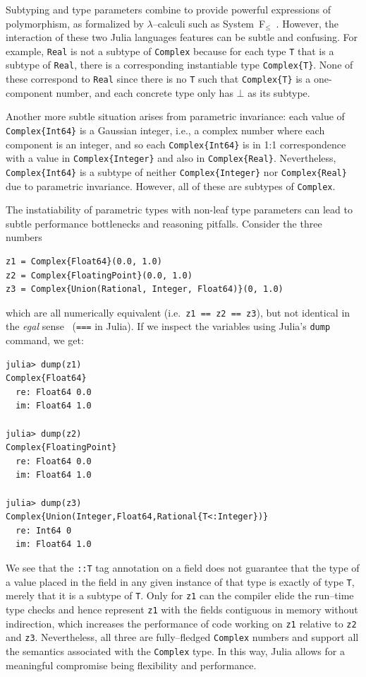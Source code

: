 \documentclass[pldi]{sigplanconf-pldi15}
\begin{document}
Subtyping and type parameters combine to provide powerful expressions of
polymorphism, as formalized by $\lambda$--calculi such as
System~F$_\le$~\cite{Cardelli1985}. However, the interaction of these two
Julia languages features can be subtle and confusing. For example, \verb|Real|
is not a subtype of \verb|Complex| because for each type \verb|T| that is a
subtype of \verb|Real|, there is a corresponding instantiable type
\verb|Complex{T}|. None of these correspond to \verb|Real| since there is no
\verb|T| such that \verb|Complex{T}| is a one-component number, and each
concrete type only has $\bot$ as its subtype.

Another more subtle situation arises from parametric invariance: each value of
\verb|Complex{Int64}| is a Gaussian integer, i.e., a complex number where each
component is an integer, and so each \verb|Complex{Int64}| is in 1:1
correspondence with a value in \verb|Complex{Integer}| and also in
\verb|Complex{Real}|. Nevertheless, \verb|Complex{Int64}| is a subtype of
neither \verb|Complex{Integer}| nor \verb|Complex{Real}| due to parametric
invariance. However, all of these are subtypes of \verb|Complex|.

The instatiability of parametric types with non-leaf type parameters can lead
to subtle performance bottlenecks and reasoning pitfalls. Consider the three
 numbers

\begin{lstlisting}
z1 = Complex{Float64}(0.0, 1.0)
z2 = Complex{FloatingPoint}(0.0, 1.0)
z3 = Complex{Union(Rational, Integer, Float64)}(0, 1.0)
\end{lstlisting}
%
which are all numerically equivalent (i.e.\ \verb|z1 == z2 == z3|), but not
identical in the \textit{egal} sense~\cite{Baker1993} (\verb|===| in Julia).
If we inspect the variables using Julia's \verb|dump| command, we get:

\begin{lstlisting}
julia> dump(z1)
Complex{Float64}
  re: Float64 0.0
  im: Float64 1.0

julia> dump(z2)
Complex{FloatingPoint}
  re: Float64 0.0
  im: Float64 1.0

julia> dump(z3)
Complex{Union(Integer,Float64,Rational{T<:Integer})}
  re: Int64 0
  im: Float64 1.0
\end{lstlisting}
%
We see that the \verb|::T| tag annotation on a field does not guarantee that
the type of a value placed in the field in any given instance of that type is
exactly of type \verb|T|, merely that it is a subtype of \verb|T|. Only for
\verb|z1| can the compiler elide the run--time type checks and hence represent
\verb|z1| with the fields contiguous in memory without indirection, which
increases the performance of code working on \verb|z1| relative to \verb|z2|
and \verb|z3|. Nevertheless, all three are fully--fledged \verb|Complex|
numbers and support all the semantics associated with the \verb|Complex| type.
In this way, Julia allows for a meaningful compromise being flexibility and
performance.
\end{document}
